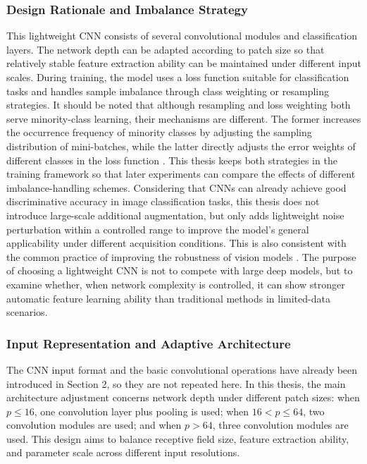 \subsubsection{Design Rationale and Imbalance Strategy}
\par This lightweight CNN consists of several convolutional modules and
classification layers. The network depth can be adapted according to patch size
so that relatively stable feature extraction ability can be maintained under
different input scales. During training, the model uses a loss function suitable
for classification tasks and handles sample imbalance through class weighting or
resampling strategies. It should be noted that although resampling and loss
weighting both serve minority-class learning, their mechanisms are different.
The former increases the occurrence frequency of minority classes by adjusting
the sampling distribution of mini-batches, while the latter directly adjusts the
error weights of different classes in the loss function
\cite{buda2018systematic,Cui_2019_CVPR}. This thesis keeps both strategies in
the training framework so that later experiments can compare the effects of
different imbalance-handling schemes. Considering that CNNs can already achieve
good discriminative accuracy in image classification tasks, this thesis does not
introduce large-scale additional augmentation, but only adds lightweight noise
perturbation within a controlled range to improve the model's general
applicability under different acquisition conditions. This is also consistent
with the common practice of improving the robustness of vision models
\cite{shorten2019survey}. The purpose of choosing a lightweight CNN is not to
compete with large deep models, but to examine whether, when network complexity
is controlled, it can show stronger automatic feature learning ability than
traditional methods in limited-data scenarios.

\subsubsection{Input Representation and Adaptive Architecture}
\par The CNN input format and the basic convolutional operations have already
been introduced in Section 2, so they are not repeated here. In this thesis, the
main architecture adjustment concerns network depth under different patch sizes:
when $p\le 16$, one convolution layer plus pooling is used; when $16<p\le 64$,
two convolution modules are used; and when $p>64$, three convolution modules are
used. This design aims to balance receptive field size, feature extraction
ability, and parameter scale across different input resolutions.


